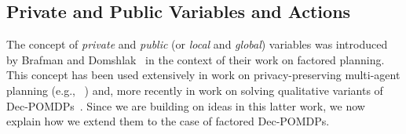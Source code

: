 \documentclass[letterpaper]{article} %
\newcommand{\eliran}[1]{\textbf{[\color{red}ELIRAN:#1]}}
\newcommand{\guy}[1]{\textbf{[\color{orange}GUY:#1]}}
\begin{document}

\subsection{Private and Public Variables and Actions}
The concept of \emph{private} and \emph{public} (or \emph{local} and \emph{global}) variables was introduced by
Brafman and Domshlak~\cite{} in the context of their work on factored planning. This concept has been used extensively
in work on privacy-preserving multi-agent planning (e.g., ~\cite{}) and, more recently in work on solving qualitative variants
of Dec-POMDPs~\cite{}. Since we are building on ideas in this latter work, we now explain how we extend them to the
case of factored Dec-POMDPs.

\end{document}
